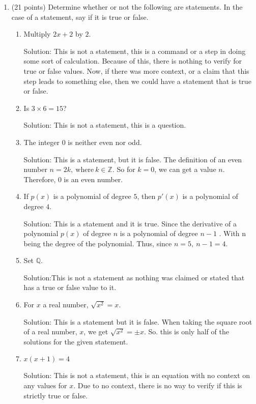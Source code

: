 \documentclass[11pt]{amsart}
\newcommand{\Z}{\mathbb{Z}}
\begin{document}
\begin{enumerate}
\item (21 points) Determine whether or not the following are statements. In the case of a statement, say if it is true or false. 
\begin{enumerate}
\item Multiply $2x+2$ by $2$.

Solution: This is not a statement, this is a command or a step in doing some sort of calculation. Because of this, there is nothing to verify for true or false values. Now, if there was more context, or a claim that this step leads to something else, then we could have a statement that is true or false.

\item Is $3\times 6=15$?

Solution: This is not a statement, this is a question.

\item The integer $0$ is neither even nor odd.

Solution: This is a statement, but it is false. The definition of an even number $n = 2k, \ \text{where} \ k \in \Z$. So for $ k =0 $, we can get a value $n$. Therefore, $0$ is an even number.

\item If $p(x)$ is a polynomial of degree $5$, then $p'(x)$ is a polynomial of degree $4$.

Solution: This is a statement and it is true. Since the derivative of a polynomial $p(x)$ of degree $n$ is a polynomial of degree $n-1$ . With n being the degree of the polynomial. Thus, since $n = 5, \ n-1 = 4$.

\item Set $\mathbb{Q}$.

Solution:This is not a statement as nothing was claimed or stated that has a true or false value to it.

\item For $x$ a real number, $\sqrt{x^2}=x$.

Solution: This is a statement but it is false. When taking the square root of a real number, $x$, we get $\sqrt{x^2} = \pm x$. So. this is only half of the solutions for the given statement.

\item $x(x+1)=4$

Solution: This is not a statement, this is an equation with no context on any values for $x$. Due to no context, there is no way to verify if this is strictly true or false.
\end{enumerate}


\end{enumerate}
\end{document}
